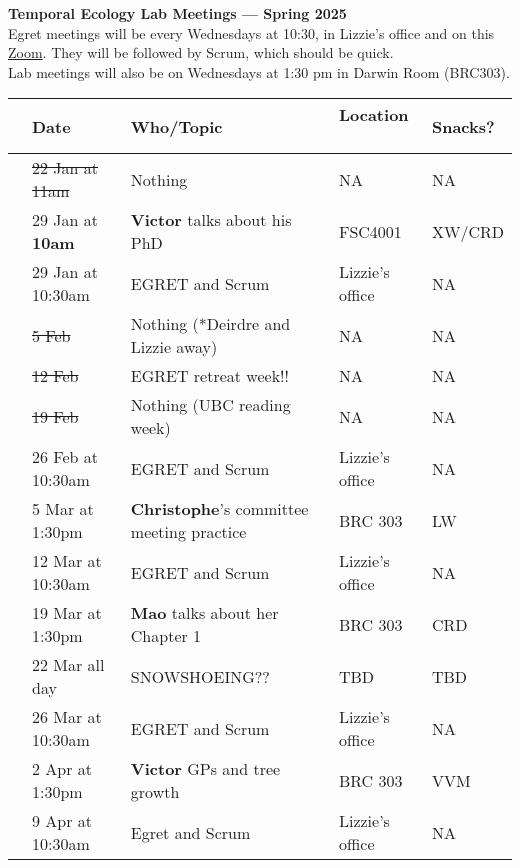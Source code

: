 \documentclass[11pt]{article}
\begin{document}
 
\raggedright
{}

\begin{center} 
{\large \textbf{Temporal Ecology Lab Meetings --- Spring 2025}} \\ [2pt]
Egret meetings will be every Wednesdays at 10:30, in Lizzie's office and on this  \href{https://ubc.zoom.us/j/61453894591?pwd=b2U5MTmUXtOCTKFlBW1s3pBMvHYWP9.1}{Zoom}. They will be followed by Scrum, which should be quick. 
\\ Lab meetings will also be on Wednesdays at 1:30 pm in Darwin Room (BRC303).\\ %
\end{center} 

\begin{center}
\begin{tabular}{ p{0.2 cm}  p{3.2 cm}  p{6 cm}  p{4 cm} p{1.5 cm} }  \hline \hline
 & \textbf{Date}
   & \textbf{Who/Topic}
      & \textbf{Location}  \
            & \textbf{Snacks?}  \\ 
\hline \hline
&\sout{22 Jan at 11am}& Nothing  & NA & NA \\\hline
&29 Jan at \textbf{10am} & \textbf{Victor} talks about his PhD & FSC4001 & XW/CRD \\\hline
&29 Jan at 10:30am & EGRET and Scrum & Lizzie's office & NA \\\hline
&\sout{5 Feb} & Nothing (*Deirdre and Lizzie away) &NA&NA\\\hline
&\sout{12 Feb} & EGRET retreat week!! & NA &NA \\\hline
&\sout{19 Feb} & Nothing (UBC reading week) &NA& NA \\\hline
&26 Feb at 10:30am & EGRET and Scrum & Lizzie's office & NA \\\hline
&5 Mar at 1:30pm & \textbf{Christophe}'s committee meeting practice  & BRC 303 & LW \\\hline
&12 Mar at 10:30am & EGRET and Scrum& Lizzie's office  &NA \\\hline
&19 Mar at 1:30pm & \textbf{Mao} talks about her Chapter  1 & BRC 303 &  CRD \\\hline
&22 Mar all day & SNOWSHOEING?? & TBD & TBD  \\\hline
&26 Mar at 10:30am & EGRET and Scrum& Lizzie's office  & NA \\\hline
&2 Apr at 1:30pm & \textbf{Victor} GPs and tree growth & BRC 303 & VVM \\\hline
&9 Apr at 10:30am & Egret and Scrum & Lizzie's office & NA \\\hline
\end{tabular}
\end{center}
\end{document}
